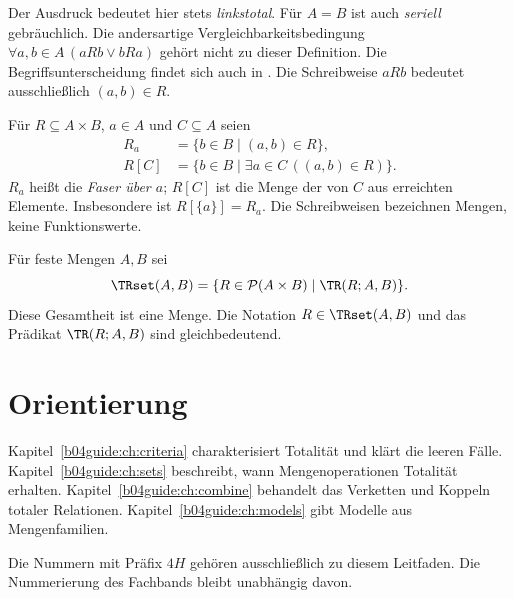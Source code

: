 Der Ausdruck bedeutet hier stets \emph{linkstotal}.
Für $A=B$ ist auch \emph{seriell} gebräuchlich.
Die andersartige Vergleichbarkeitsbedingung
$\forall a,b\in A\,(aRb\lor bRa)$ gehört nicht zu dieser
Definition. Die Begriffsunterscheidung findet sich auch
in \cite[Abschnitt~5.3, Fußnote~5]{meseguer}.
Die Schreibweise $aRb$ bedeutet ausschließlich $(a,b)\in R$.

\begin{definition}\label{b04guide:def:fiber}
Für $R\subseteq A\times B$, $a\in A$ und $C\subseteq A$ seien
\[
 \begin{aligned}
 R_a&=\{b\in B\mid(a,b)\in R\},\\
 R[C]&=\{b\in B\mid\exists a\in C\,((a,b)\in R)\}.
 \end{aligned}
\]
$R_a$ heißt die \emph{Faser über $a$}; $R[C]$ ist die Menge
der von $C$ aus erreichten Elemente.
Insbesondere ist $R[\{a\}]=R_a$.
Die Schreibweisen bezeichnen Mengen, keine Funktionswerte.
\end{definition}

\begin{definition}\label{b04guide:def:all}
Für feste Mengen $A,B$ sei
\[
 \TRset(A,B)=
 \{R\in\mathcal P(A\times B)\mid \TR(R;A,B)\}.
\]
Diese Gesamtheit ist eine Menge. Die Notation
$R\in\TRset(A,B)$ und das Prädikat $\TR(R;A,B)$ sind gleichbedeutend.
\end{definition}

\section{Orientierung}

Kapitel~\ref{b04guide:ch:criteria} charakterisiert Totalität und
klärt die leeren Fälle. Kapitel~\ref{b04guide:ch:sets} beschreibt,
wann Mengenoperationen Totalität erhalten.
Kapitel~\ref{b04guide:ch:combine} behandelt das Verketten und
Koppeln totaler Relationen. Kapitel~\ref{b04guide:ch:models}
gibt Modelle aus Mengenfamilien.

Die Nummern mit Präfix $4H$ gehören ausschließlich zu diesem
Leitfaden. Die Nummerierung des Fachbands bleibt unabhängig davon.
